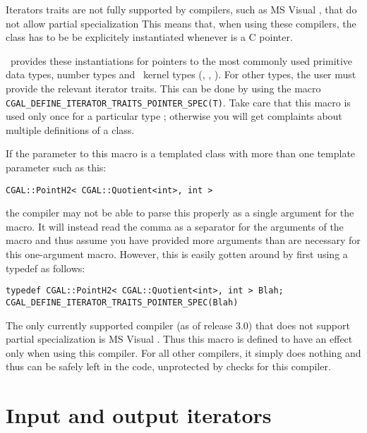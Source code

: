 Iterators traits are not fully supported by compilers, such as MS Visual \CC,
that do not allow partial specialization 
This means that, when using these compilers,
the class  has to be be explicitely
instantiated whenever  is a C pointer.

\cgal\ provides these instantiations for pointers to 
the most commonly used primitive data types, number types and
\cgal\ kernel types (, , \etc).
For other types, the user must provide the relevant iterator traits. 
This can be done by using the macro
\texttt{CGAL\_\-DEFINE\_\-ITERATOR\_\-TRAITS\_\-POINTER\_\-SPEC(T)}.
Take care that this macro is used only once for a particular type ; 
otherwise you will get complaints about multiple definitions of a class.

If the parameter to this macro is a templated class with more than
one template parameter such as this:
\begin{center}
\verb|CGAL::PointH2< CGAL::Quotient<int>, int >|
\end{center}
the compiler may not be able to parse this properly as a single argument for 
the macro. It will instead read the comma as a separator for the arguments of 
the macro and thus assume you have provided more arguments than are necessary
for this one-argument macro.  However, this is easily gotten around by 
first using a typedef as follows:
\begin{verbatim}
typedef CGAL::PointH2< CGAL::Quotient<int>, int > Blah;
CGAL_DEFINE_ITERATOR_TRAITS_POINTER_SPEC(Blah)
\end{verbatim}

The only currently supported compiler (as of release 3.0) that does not
support partial specialization is MS Visual . Thus this macro is defined
to have an effect only when using this compiler.  For all other compilers,
it simply does nothing and thus can be safely left in the code, unprotected
by checks for this compiler.


\section{Input and output iterators}
\label{sec:input_and_output_iterators}

